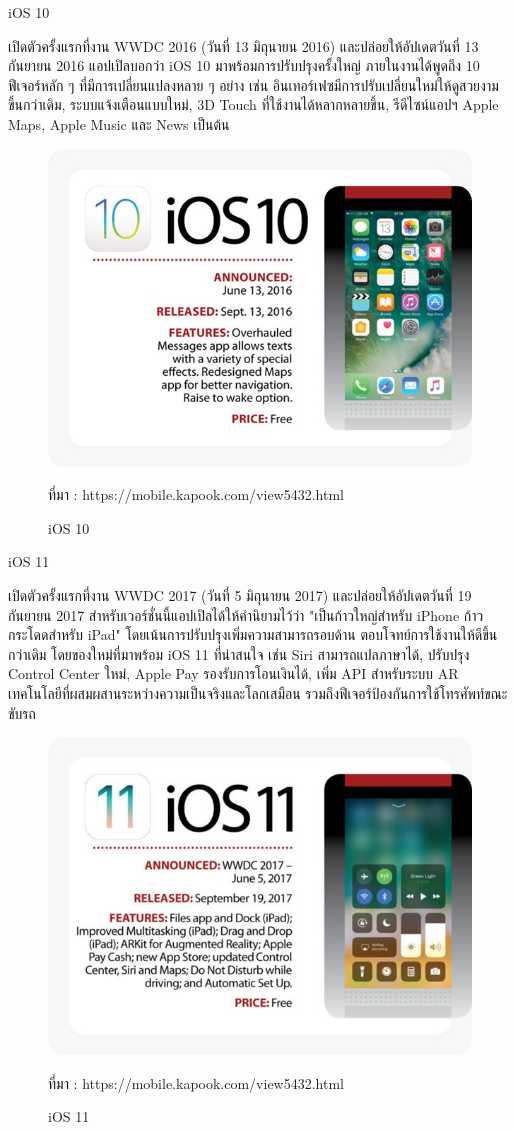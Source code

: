 	iOS 10 

	เปิดตัวครั้งแรกที่งาน WWDC 2016 (วันที่ 13 มิถุนายน 2016) และปล่อยให้อัปเดตวันที่ 13 กันยายน 2016 แอปเปิลบอกว่า iOS 10 มาพร้อมการปรับปรุงครั้งใหญ่ ภายในงานได้พูดถึง 10 ฟีเจอร์หลัก ๆ ที่มีการเปลี่ยนแปลงหลาย ๆ อย่าง เช่น อินเทอร์เฟซมีการปรับเปลี่ยนใหม่ให้ดูสวยงามขึ้นกว่าเดิม, ระบบแจ้งเตือนแบบใหม่, 3D Touch ที่ใช้งานได้หลากหลายขึ้น, รีดีไซน์แอปฯ Apple Maps, Apple Music และ News เป็นต้น

	\begin{figure}[H]
		\centering
		\includegraphics[width=0.8\columnwidth]{Figures/2/iOS/iOS10}
		\caption{iOS 10}{ที่มา : https://mobile.kapook.com/view5432.html}
		\label{Fig:iosversion10}
	\end{figure}

	iOS 11 

	เปิดตัวครั้งแรกที่งาน WWDC 2017 (วันที่ 5 มิถุนายน 2017) และปล่อยให้อัปเดตวันที่ 19 กันยายน 2017 สำหรับเวอร์ชั่นนี้แอปเปิลได้ให้คำนิยามไว้ว่า "เป็นก้าวใหญ่สำหรับ iPhone ก้าวกระโดดสำหรับ iPad" โดยเน้นการปรับปรุงเพิ่มความสามารถรอบด้าน ตอบโจทย์การใช้งานให้ดีขึ้นกว่าเดิม โดยของใหม่ที่มาพร้อม iOS 11 ที่น่าสนใจ เช่น Siri สามารถแปลภาษาได้, ปรับปรุง Control Center ใหม่, Apple Pay รองรับการโอนเงินได้, เพิ่ม API สำหรับระบบ AR เทคโนโลยีที่ผสมผสานระหว่างความเป็นจริงและโลกเสมือน รวมถึงฟีเจอร์ป้องกันการใช้โทรศัพท์ขณะขับรถ

	\begin{figure}[H]
		\centering
		\includegraphics[width=0.8\columnwidth]{Figures/2/iOS/iOS11}
		\caption{iOS 11}{ที่มา : https://mobile.kapook.com/view5432.html}
		\label{Fig:iosversion11}
	\end{figure}
	
